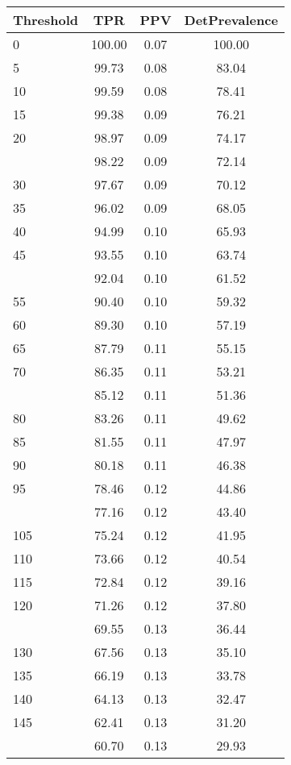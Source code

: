 \begin{table}[ht]
\centering
\begin{tabular}{lccc}
  \toprule
Threshold & TPR & PPV & DetPrevalence \\ 
  \midrule
0 & 100.00 & 0.07 & 100.00 \\ 
  5 & 99.73 & 0.08 & 83.04 \\ 
  10 & 99.59 & 0.08 & 78.41 \\ 
  15 & 99.38 & 0.09 & 76.21 \\ 
  20 & 98.97 & 0.09 & 74.17 \\ 
   \addlinespace
25 & 98.22 & 0.09 & 72.14 \\ 
  30 & 97.67 & 0.09 & 70.12 \\ 
  35 & 96.02 & 0.09 & 68.05 \\ 
  40 & 94.99 & 0.10 & 65.93 \\ 
  45 & 93.55 & 0.10 & 63.74 \\ 
   \addlinespace
50 & 92.04 & 0.10 & 61.52 \\ 
  55 & 90.40 & 0.10 & 59.32 \\ 
  60 & 89.30 & 0.10 & 57.19 \\ 
  65 & 87.79 & 0.11 & 55.15 \\ 
  70 & 86.35 & 0.11 & 53.21 \\ 
   \addlinespace
75 & 85.12 & 0.11 & 51.36 \\ 
  80 & 83.26 & 0.11 & 49.62 \\ 
  85 & 81.55 & 0.11 & 47.97 \\ 
  90 & 80.18 & 0.11 & 46.38 \\ 
  95 & 78.46 & 0.12 & 44.86 \\ 
   \addlinespace
100 & 77.16 & 0.12 & 43.40 \\ 
  105 & 75.24 & 0.12 & 41.95 \\ 
  110 & 73.66 & 0.12 & 40.54 \\ 
  115 & 72.84 & 0.12 & 39.16 \\ 
  120 & 71.26 & 0.12 & 37.80 \\ 
   \addlinespace
125 & 69.55 & 0.13 & 36.44 \\ 
  130 & 67.56 & 0.13 & 35.10 \\ 
  135 & 66.19 & 0.13 & 33.78 \\ 
  140 & 64.13 & 0.13 & 32.47 \\ 
  145 & 62.41 & 0.13 & 31.20 \\ 
   \addlinespace
150 & 60.70 & 0.13 & 29.93 \\ 

\end{tabular}
\end{table}
